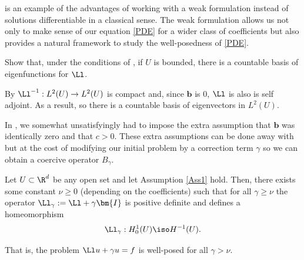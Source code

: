 \documentclass[
    a4paper,
    DIV=14,
    abstract=true,
    numbers=noenddot
]{scrartcl}
\begin{document}
 is an example of the advantages of working with a weak formulation instead of solutions differentiable in a classical sense. The weak formulation allows us not only to make sense of our equation \eqref{PDE} for a wider class of coefficients but also provides a natural framework to study the well-posedness of \eqref{PDE}.
\begin{exercise}
    Show that, under the conditions of , if $U$ is bounded, there is a countable basis of eigenfunctions for $\Ll$.
\end{exercise}
\begin{hint}
    By  $\Ll^{-1}: L^2(U) \to L^2(U) $ is compact and, since $\bm{b}$ is $0$, $\Ll $ is also is self adjoint. As a result, so there is a countable basis of eigenvectors in $L^2(U)$.
\end{hint}
In , we somewhat unsatisfyingly had to impose the extra assumption that $ \bm{b}$ was identically zero and that $c > 0$. These extra assumptions can be done away with but at the cost of modifying our initial problem by a correction term $\gamma $ so we can obtain a coercive operator $B_\gamma $.
\begin{theorem}\label{mod}
    Let $U \subset \R^d$ be any open set and let Assumption \ref{Ass1} hold. Then, there exists some constant $\nu \geq 0$ (depending on the coefficients) such that for all $\gamma \geq \nu$ the operator $\Ll_\gamma := \Ll + \gamma \bm{I}$ is positive definite and defines a homeomorphism
    \begin{align*}
        \Ll_\gamma : H_0^1(U) \iso H^{-1}(U).
    \end{align*}
\end{theorem}
That is, the problem $\Ll u +\gamma u =f$ is well-posed for all $\gamma > \nu$.
\end{document}
